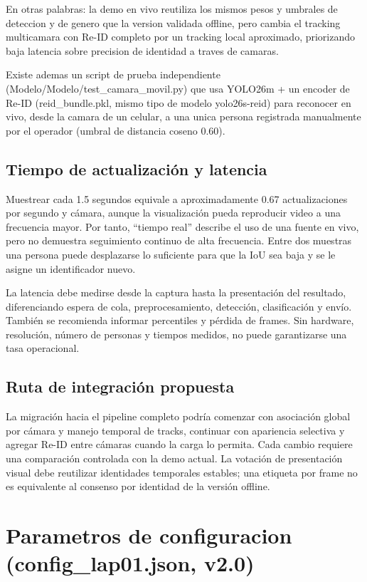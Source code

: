 \documentclass[12pt,letterpaper]{article}
\begin{document}
En otras palabras: la demo en vivo reutiliza los mismos pesos y umbrales de deteccion y de genero que la version validada offline, pero cambia el tracking multicamara con Re-ID completo por un tracking local aproximado, priorizando baja latencia sobre precision de identidad a traves de camaras.


Existe ademas un script de prueba independiente (Modelo/\allowbreak Modelo/\allowbreak test\_\allowbreak camara\_\allowbreak movil.py) que usa YOLO26m + un encoder de Re-ID (reid\_\allowbreak bundle.pkl, mismo tipo de modelo yolo26s-reid) para reconocer en vivo, desde la camara de un celular, a una unica persona registrada manualmente por el operador (umbral de distancia coseno 0.60).


\subsection{Tiempo de actualización y latencia}
Muestrear cada 1.5 segundos equivale a aproximadamente 0.67 actualizaciones por segundo y cámara, aunque la visualización pueda reproducir video a una frecuencia mayor. Por tanto, ``tiempo real'' describe el uso de una fuente en vivo, pero no demuestra seguimiento continuo de alta frecuencia. Entre dos muestras una persona puede desplazarse lo suficiente para que la IoU sea baja y se le asigne un identificador nuevo.

La latencia debe medirse desde la captura hasta la presentación del resultado, diferenciando espera de cola, preprocesamiento, detección, clasificación y envío. También se recomienda informar percentiles y pérdida de frames. Sin hardware, resolución, número de personas y tiempos medidos, no puede garantizarse una tasa operacional.

\subsection{Ruta de integración propuesta}
La migración hacia el pipeline completo podría comenzar con asociación global por cámara y manejo temporal de tracks, continuar con apariencia selectiva y agregar Re-ID entre cámaras cuando la carga lo permita. Cada cambio requiere una comparación controlada con la demo actual. La votación de presentación visual debe reutilizar identidades temporales estables; una etiqueta por frame no es equivalente al consenso por identidad de la versión offline.

\section{Parametros de configuracion (config\_\allowbreak lap01.json, v2.0)}
\end{document}
